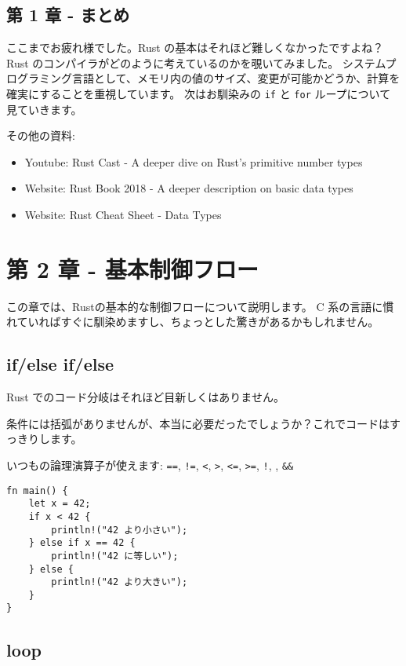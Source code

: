 \subsection{第 1 章 -
まとめ}

ここまでお疲れ様でした。Rust の基本はそれほど難しくなかったですよね？
Rust のコンパイラがどのように考えているのかを覗いてみました。
システムプログラミング言語として、メモリ内の値のサイズ、変更が可能かどうか、計算を確実にすることを重視しています。
次はお馴染みの \texttt{if} と \texttt{for} ループについて見ていきます。

その他の資料:

\begin{itemize}
\item
  Youtube: Rust Cast - A deeper dive on Rust's primitive number types
\item
  Website: Rust Book 2018 - A deeper description on basic data types
\item
  Website: Rust Cheat Sheet - Data Types
\end{itemize}

\section{第 2 章 -
基本制御フロー}

この章では、Rustの基本的な制御フローについて説明します。 C
系の言語に慣れていればすぐに馴染めますし、ちょっとした驚きがあるかもしれません。

\subsection{if/else if/else}

Rust でのコード分岐はそれほど目新しくはありません。

条件には括弧がありませんが、本当に必要だったでしょうか？これでコードはすっきりします。

いつもの論理演算子が使えます: \texttt{==}, \texttt{!=},
\texttt{\textless{}}, \texttt{\textgreater{}}, \texttt{\textless{}=},
\texttt{\textgreater{}=}, \texttt{!}, \texttt{\textbar{}\textbar{}},
\texttt{\&\&}

\begin{verbatim}
fn main() {
    let x = 42;
    if x < 42 {
        println!("42 より小さい");
    } else if x == 42 {
        println!("42 に等しい");
    } else {
        println!("42 より大きい");
    }
}
\end{verbatim}

\subsection{loop}

